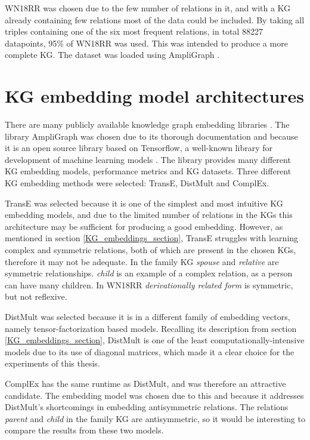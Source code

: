 WN18RR was chosen due to the few number of relations in it, and with a KG already containing few relations most of the data could be included.
By taking all triples containing one of the six most frequent relations, in total 88227 datapoints, 95\% of WN18RR was used. This was intended to produce a more complete KG. The dataset was loaded using AmpliGraph \cite{ampligraph}.

\section{KG embedding model architectures}
\label{selected_KG_embedding_models}
There are many publicly available knowledge graph embedding libraries \cite{libkge, chandrahas-etal-2018-towards, ali2021pykeen}. The library AmpliGraph was chosen due to its thorough documentation and because it is an open source library based on Tensorflow, a well-known library for development of machine learning models \cite{tensorflow}. The library provides many different KG embedding models, performance metrics and KG datasets. Three different KG embedding methods were selected: TransE, DistMult and ComplEx. 

TransE was selected because it is one of the simplest and most intuitive KG embedding models, and due to the limited number of relations in the KGs this architecture may be sufficient for producing a good embedding. However, as mentioned in section \ref{KG_embeddings_section}, TransE struggles with learning complex and symmetric relations, both of which are present in the chosen KGs, therefore it may not be adequate. In the family KG \textit{spouse} and \textit{relative} are symmetric relationships. \textit{child} is an example of a complex relation, as a person can have many children. In WN18RR \textit{derivationally related form} is symmetric, but not reflexive.

DistMult was selected because it is in a different family of embedding vectors, namely tensor-factorization based models. Recalling its description from section \ref{KG_embeddings_section}, DistMult is one of the least computationally-intensive models due to its use of diagonal matrices, which made it a clear choice for the experiments of this thesis.

ComplEx has the same runtime as DistMult, and was therefore an attractive candidate. The embedding model was chosen due to this and because it addresses DistMult's shortcomings in embedding antisymmetric relations. The relations \textit{parent} and \textit{child} in the family KG are antisymmetric, so it would be interesting to compare the results from these two models.

